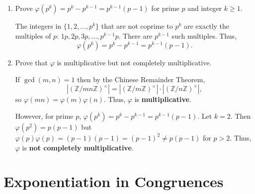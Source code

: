\documentclass[11pt]{article}
\begin{document}
\begin{enumerate}
  \item Prove $\varphi(p^k)=p^k-p^{k-1}=p^{k-1}(p-1)$ for prime $p$ and integer $k\ge1$.
  \begin{subprove}
    The integers in $\{1,2,\dots,p^k\}$ that are not coprime to $p^k$ are exactly the 
    multiples of $p$: $1p,2p,3p,\dots,p^{k-1}p$. There are $p^{k-1}$ such multiples. Thus,
    \[
      \varphi(p^k) = p^k - p^{k-1} = p^{k-1}(p-1).
    \]
  \end{subprove}
  \item Prove that $\varphi$ is multiplicative but not completely multiplicative.
  \begin{subprove}
    If $\gcd(m,n)=1$ then by the Chinese Remainder Theorem,
    \[
      |(\mathbb{Z}/mn\mathbb{Z})^\times| = |(\mathbb{Z}/m\mathbb{Z})^\times| \cdot |(\mathbb{Z}/n\mathbb{Z})^\times|,
    \]
    so $\varphi(mn) = \varphi(m)\varphi(n)$. Thus, $\varphi$ is \textbf{multiplicative}.
    
    However, for prime $p$, $\varphi(p^k)=p^k-p^{k-1}=p^{k-1}(p-1)$. Let $k=2$. Then $\varphi(p^2)=p(p-1)$ but 
    $\varphi(p)\varphi(p)=(p-1)(p-1)=(p-1)^2\neq p(p-1)$ for $p>2$. 
    Thus, $\varphi$ is \textbf{not completely multiplicative}.
  \end{subprove}
\end{enumerate}




















\newpage



























\newpage
\section*{Exponentiation in Congruences}
\end{document}
